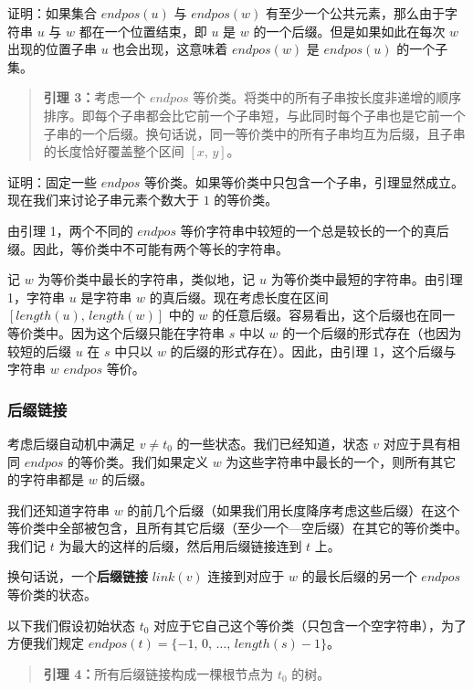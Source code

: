 证明：如果集合 \(endpos(u)\) 与 \(endpos(w)\)
有至少一个公共元素，那么由于字符串 \(u\) 与 \(w\) 都在一个位置结束，即
\(u\) 是 \(w\) 的一个后缀。但是如果如此在每次 \(w\) 出现的位置子串 \(u\)
也会出现，这意味着 \(endpos(w)\) 是 \(endpos(u)\) 的一个子集。

\begin{quote}
\textbf{引理 3：}考虑一个 \(endpos\)
等价类。将类中的所有子串按长度非递增的顺序排序。即每个子串都会比它前一个子串短，与此同时每个子串也是它前一个子串的一个后缀。换句话说，同一等价类中的所有子串均互为后缀，且子串的长度恰好覆盖整个区间
\([x,\,y]\)。
\end{quote}

证明：固定一些 \(endpos\)
等价类。如果等价类中只包含一个子串，引理显然成立。现在我们来讨论子串元素个数大于
\(1\) 的等价类。

由引理 1，两个不同的 \(endpos\)
等价字符串中较短的一个总是较长的一个的真后缀。因此，等价类中不可能有两个等长的字符串。

记 \(w\) 为等价类中最长的字符串，类似地，记 \(u\)
为等价类中最短的字符串。由引理 1，字符串 \(u\) 是字符串 \(w\)
的真后缀。现在考虑长度在区间 \([length(u),\,length(w)]\) 中的 \(w\)
的任意后缀。容易看出，这个后缀也在同一等价类中。因为这个后缀只能在字符串
\(s\) 中以 \(w\) 的一个后缀的形式存在（也因为较短的后缀 \(u\) 在 \(s\)
中只以 \(w\) 的后缀的形式存在）。因此，由引理 1，这个后缀与字符串 \(w\)
\(endpos\) 等价。

\subsubsection{后缀链接}

考虑后缀自动机中满足 \(v\ne t_0\) 的一些状态。我们已经知道，状态 \(v\)
对应于具有相同 \(endpos\) 的等价类。我们如果定义 \(w\)
为这些字符串中最长的一个，则所有其它的字符串都是 \(w\) 的后缀。

我们还知道字符串 \(w\)
的前几个后缀（如果我们用长度降序考虑这些后缀）在这个等价类中全部被包含，且所有其它后缀（至少一个---空后缀）在其它的等价类中。我们记
\(t\) 为最大的这样的后缀，然后用后缀链接连到 \(t\) 上。

换句话说，一个\textbf{后缀链接} \(link(v)\) 连接到对应于 \(w\)
的最长后缀的另一个 \(endpos\) 等价类的状态。

以下我们假设初始状态 \(t_0\)
对应于它自己这个等价类（只包含一个空字符串），为了方便我们规定
\(endpos(t)=\{-1,\,0,\,\ldots,\,length(s)-1\}\)。

\begin{quote}
\textbf{引理 4：}所有后缀链接构成一棵根节点为 \(t_0\) 的树。
\end{quote}

